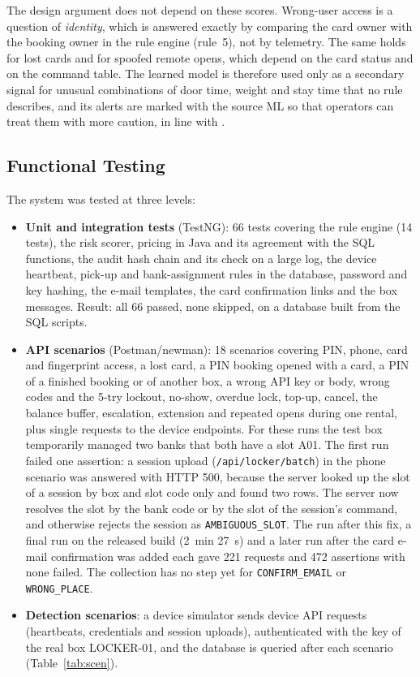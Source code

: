 \documentclass[conference, onecolumn]{IEEEtran}
\begin{document}
The design argument does not depend on these scores. Wrong-user access is a question of \emph{identity}, which is answered exactly
by comparing the card owner with the booking owner in the rule engine (rule~5), not by telemetry. The same holds for lost
cards and for spoofed remote opens, which depend on the card status and on the command table. The learned model is
therefore used only as a secondary signal for unusual combinations of door time, weight and stay time that no rule
describes, and its alerts are marked with the source ML so that operators can treat them with more caution, in line
with \cite{sommer2010outside}.

\subsection{Functional Testing}
\label{sec:tests}

The system was tested at three levels:
\begin{itemize}
  \item \textbf{Unit and integration tests} (TestNG): 66 tests covering the rule engine (14 tests), the risk scorer,
        pricing in Java and its agreement with the SQL functions, the audit hash chain and its check on a large log, the
        device heartbeat, pick-up and bank-assignment rules in the database, password and key hashing, the e-mail
        templates, the card confirmation links and the box messages. Result: all 66 passed, none skipped, on a database
        built from the SQL scripts.
  \item \textbf{API scenarios} (Postman/newman): 18 scenarios covering PIN, phone, card and fingerprint access, a lost
        card, a PIN booking opened with a card, a PIN of a finished booking or of another box, a wrong API key or body,
        wrong codes and the 5-try lockout, no-show, overdue lock, top-up, cancel, the balance buffer, escalation,
        extension and repeated opens during one rental, plus single requests to the device endpoints. For these runs the
        test box temporarily managed two banks that both have a slot A01. The first run failed one assertion: a session
        upload (\texttt{/api/locker/batch}) in the phone scenario was answered with HTTP 500, because the server looked
        up the slot of a session by box and slot code only and found two rows. The server now resolves the slot by the
        bank code or by the slot of the session's command, and otherwise rejects the session as
        \texttt{AMBIGUOUS\_SLOT}. The run after this fix, a final run on the released build (2~min 27~s) and a later run
        after the card e-mail confirmation was added each gave 221 requests and 472 assertions with none failed. The
        collection has no step yet for \texttt{CONFIRM\_EMAIL} or \texttt{WRONG\_PLACE}.
  \item \textbf{Detection scenarios}: a device simulator sends device API requests (heartbeats, credentials and session
        uploads), authenticated with the key of the real box LOCKER-01, and the database is queried after each scenario (Table~\ref{tab:scen}).
\end{itemize}
\end{document}
